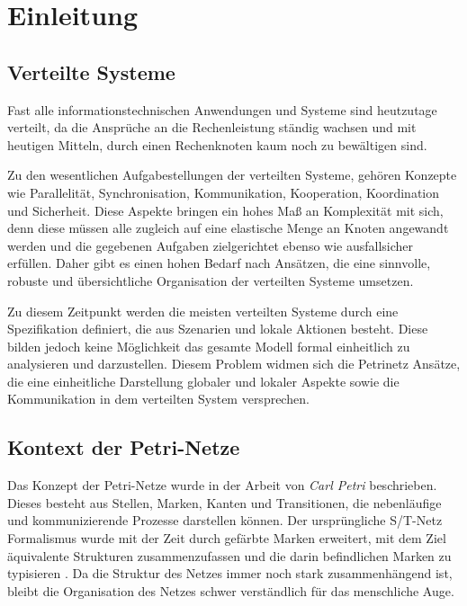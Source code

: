 \chapter{Einleitung}

\section{Verteilte Systeme}

	Fast alle informationstechnischen Anwendungen und Systeme sind heutzutage verteilt, da die Ansprüche an die Rechenleistung ständig wachsen und mit heutigen Mitteln, durch einen Rechenknoten kaum noch zu bewältigen sind. \bigbreak

	Zu den wesentlichen Aufgabestellungen der verteilten Systeme, gehören Konzepte wie Parallelität, Synchronisation, Kommunikation, Kooperation, Koordination und Sicherheit. Diese Aspekte bringen ein hohes Maß an Komplexität mit sich, denn diese müssen alle zugleich auf eine elastische Menge an Knoten angewandt werden und die gegebenen Aufgaben zielgerichtet ebenso wie ausfallsicher erfüllen. Daher gibt es einen hohen Bedarf nach Ansätzen, die eine sinnvolle, robuste und übersichtliche Organisation der verteilten Systeme umsetzen. \bigbreak

	Zu diesem Zeitpunkt werden die meisten verteilten Systeme durch eine Spezifikation definiert, die aus Szenarien und lokale Aktionen besteht. Diese bilden jedoch keine Möglichkeit das gesamte Modell formal einheitlich zu analysieren und darzustellen. Diesem Problem widmen sich die Petrinetz Ansätze, die eine einheitliche Darstellung globaler und lokaler Aspekte sowie die Kommunikation in dem verteilten System versprechen. \cite{ochsenschlager2013modellierung}

\section{Kontext der Petri-Netze} \label{sec:KdP} 

	Das Konzept der Petri-Netze wurde in der Arbeit von \textit{Carl Petri} beschrieben. Dieses besteht aus Stellen, Marken, Kanten und Transitionen, die nebenläufige und kommunizierende Prozesse darstellen können. Der ursprüngliche S/T-Netz Formalismus wurde mit der Zeit durch gefärbte Marken erweitert, mit dem Ziel äquivalente Strukturen zusammenzufassen und die darin befindlichen Marken zu typisieren \cite{Kummer02}. Da die Struktur des Netzes immer noch stark zusammenhängend ist, bleibt die Organisation des Netzes schwer verständlich für das menschliche Auge.\bigbreak

